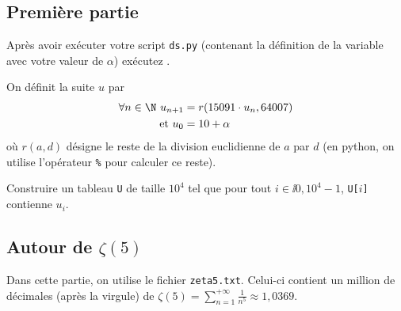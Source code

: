 \subsection{Première partie}


Après avoir exécuter votre script \texttt{ds.py} (contenant la définition de la variable  avec votre valeur de $\alpha$)  exécutez .






On définit la suite $u$ par
\begin{align*}
\forall n\in \N \ u_{n+1} &= r(15091\cdot u_{n},64007)\\
\text{et }  u_{0} & = 10 + \alpha
\end{align*}
où $r(a,d)$ désigne le reste de la division euclidienne de $a$ par
$d$ (en python, on utilise l'opérateur \texttt{\%} pour calculer ce reste).

Construire un tableau \texttt{U} de taille $10^{4}$ tel que pour tout $i\in
\ii{0,10^{4}-1}$, \texttt{U[$i$]} contienne $u_{i}$.






\subsection{Autour de $\zeta(5)$}

Dans cette partie, on utilise le fichier \texttt{zeta5.txt}. Celui-ci
contient un million de décimales (après la virgule) de $\zeta(5) =
\sum_{n=1}^{+\infty} \frac{1}{n^{5}} \approx 1,0369$.

